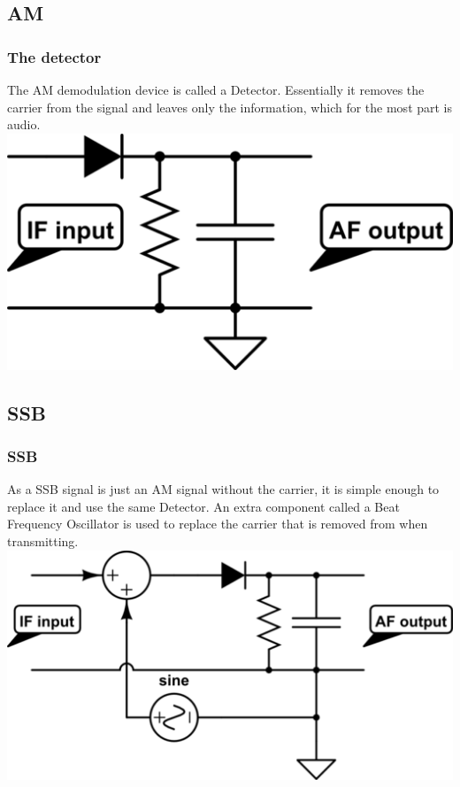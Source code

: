 \documentclass[10pt]{beamer}
\begin{document}
\subsection{AM}
\begin{frame}
\frametitle{The detector}
The AM demodulation device is called a Detector. Essentially it removes the carrier from the signal and leaves only the information, which for the most part is audio.
\includegraphics[width=.9\textwidth]{simpledetector.png}
\end{frame}

\subsection{SSB}

\begin{frame}
\frametitle{SSB}
As a SSB signal is just an AM signal without the carrier, it is simple enough to replace it and use the same Detector. An extra component called a Beat Frequency Oscillator is used to replace the carrier that is removed from when transmitting.
\includegraphics[width=.9\textwidth]{simpleproductdetector.png}
\end{frame}
\end{document}
